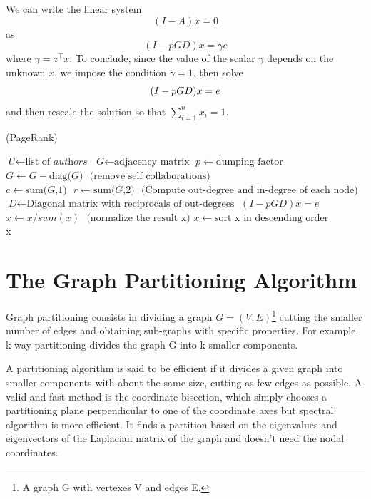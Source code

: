 \documentclass[]{usiinfbachelorproject}
\newcommand\transp[1]{{#1}^{\top}}
\begin{document}
We can write the linear system
$$(I-A)x=0$$
as
$$(I - pGD)x = \gamma e$$
where $\gamma = \transp{z}x$.
To conclude, since the value of the scalar $\gamma$ depends on the unknown $x$, we impose the condition $\gamma = 1$, then solve
\begin{equation}\notag
(I - pGD)x = e
\end{equation}
and then rescale the solution so that $\sum\limits_{i=1}^{n} x_i = 1$.

\begin{algorithm}
\caption{ (PageRank)}\label{pagerank}
\begin{algorithmic}[1]
\State $\textit{U} \gets \text{list of }\textit{authors}$
\State $\textit{G} \gets \text{adjacency matrix}$
\State $p \gets \text{dumping factor}$
\State $\textit{G} \gets \textit{G} - \text{diag(}\textit{G}\text{)} \: \: \: \text{(remove self collaborations)}$
\State $\textit{c} \gets \text{sum(}\textit{G}\text{,1)} \:\:\: \textit{r} \gets \text{sum(}\textit{G}\text{,2)} \:\:\: \text{(Compute out-degree and in-degree of each node)}$
\State $\textit{D} \gets \text{Diagonal matrix with reciprocals of out-degrees}$
\State $(I - pGD)x = e$
\State $x \gets x / sum(x) \: \:\: \text{(normalize the result x)}$
\State $x \gets \text{sort x in descending order}$\\
\Return x
\EndProcedure
\end{algorithmic}
\end{algorithm}






\section{The Graph Partitioning Algorithm} \label{sec:graphpart} 
Graph partitioning consists in dividing a graph $G=(V,E)$\footnote{A graph G with vertexes V and edges E.}  cutting the smaller number of edges and obtaining sub-graphs with specific properties. For example k-way partitioning divides the graph G into k smaller components.

A partitioning algorithm is said to be efficient if it divides a given graph into smaller components with about the same size, cutting as few edges as possible. 
A valid and fast method is the coordinate bisection, which simply chooses a partitioning plane perpendicular to one of the coordinate axes but spectral algorithm is more efficient. It finds a partition based on the eigenvalues and eigenvectors of the Laplacian matrix of the graph and doesn't need the nodal coordinates.
\end{document}
